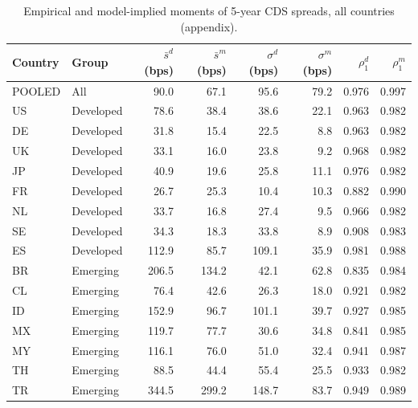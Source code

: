 \begin{table}[H]
\centering
\caption{Empirical and model-implied moments of 5-year CDS spreads, all countries (appendix).}
\label{tab:appendix_full_simulation_moments}
\begin{tabular}{llrrrrrr}
\toprule
Country & Group & $\bar{s}^d$ (bps) & $\bar{s}^m$ (bps) & $\sigma^d$ (bps) & $\sigma^m$ (bps) & $\rho^d_1$ & $\rho^m_1$ \\
\midrule
POOLED & All & 90.0 & 67.1 & 95.6 & 79.2 & 0.976 & 0.997 \\
US & Developed & 78.6 & 38.4 & 38.6 & 22.1 & 0.963 & 0.982 \\
DE & Developed & 31.8 & 15.4 & 22.5 & 8.8 & 0.963 & 0.982 \\
UK & Developed & 33.1 & 16.0 & 23.8 & 9.2 & 0.968 & 0.982 \\
JP & Developed & 40.9 & 19.6 & 25.8 & 11.1 & 0.976 & 0.982 \\
FR & Developed & 26.7 & 25.3 & 10.4 & 10.3 & 0.882 & 0.990 \\
NL & Developed & 33.7 & 16.8 & 27.4 & 9.5 & 0.966 & 0.982 \\
SE & Developed & 34.3 & 18.3 & 33.8 & 8.9 & 0.908 & 0.983 \\
ES & Developed & 112.9 & 85.7 & 109.1 & 35.9 & 0.981 & 0.988 \\
BR & Emerging & 206.5 & 134.2 & 42.1 & 62.8 & 0.835 & 0.984 \\
CL & Emerging & 76.4 & 42.6 & 26.3 & 18.0 & 0.921 & 0.982 \\
ID & Emerging & 152.9 & 96.7 & 101.1 & 39.7 & 0.927 & 0.985 \\
MX & Emerging & 119.7 & 77.7 & 30.6 & 34.8 & 0.841 & 0.985 \\
MY & Emerging & 116.1 & 76.0 & 51.0 & 32.4 & 0.941 & 0.987 \\
TH & Emerging & 88.5 & 44.4 & 55.4 & 25.5 & 0.933 & 0.982 \\
TR & Emerging & 344.5 & 299.2 & 148.7 & 83.7 & 0.949 & 0.989 \\
\bottomrule
\end{tabular}
\end{table}
